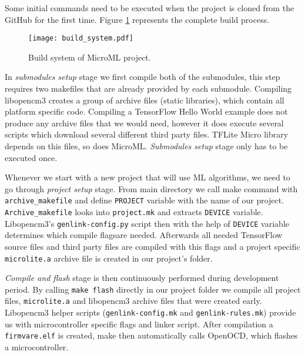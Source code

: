 Some initial commands need to be executed when the project is cloned from the GitHub for the first time. 
Figure \ref{build_system} represents the complete build process.

\begin{figure}[ht]
        \centering
        \texttt{[image: build\_system.pdf]} 
        \caption{ Build system of MicroML project.} 
        \label{build_system}
\end{figure}

In \textit{submodules setup} stage we first compile both of the submodules, this step requires two makefiles that are already provided by each submodule.
Compiling libopencm3 creates a group of archive files (static libraries), which contain all platform specific code.
Compiling a TensorFlow Hello World example does not produce any archive files that we would need, however it does execute several scripts which download several different third party files.
TFLite Micro library depends on this files, so does MicroML.
\textit{Submodules setup} stage only has to be executed once.

Whenever we start with a new project that will use ML algorithms, we need to go through \textit{project setup} stage.
From main directory we call make command with \verb|archive_makefile| and define \verb|PROJECT| variable with the name of our project.
\verb|Archive_makefile| looks into \verb|project.mk| and extracts \verb|DEVICE| variable.
Libopencm3's \verb|genlink-config.py| script then with the help of \verb|DEVICE| variable determines which compile flags\footnotemark are needed. 
Afterwards all needed TensorFlow source files and third party files are compiled with this flags and a project specific \verb|microlite.a| archive file is created in our project's folder.


\textit{Compile and flash} stage is then continuously performed during development period.
By calling \verb|make flash| directly in our project folder we compile all project files, \verb|microlite.a| and libopencm3 archive files that were created early.
Libopencm3 helper scripts (\verb|genlink-config.mk| and \verb|genlink-rules.mk|) provide us with microcontroller specific flags and linker script.
After compilation a \verb|firmvare.elf| is created, make then automatically calls OpenOCD, which flashes a microcontroller.

